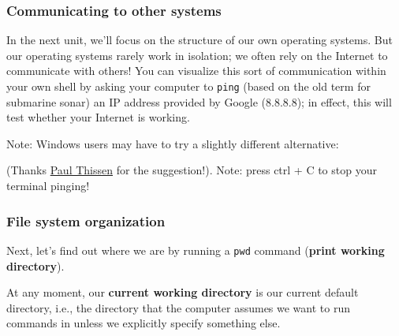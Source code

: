 \documentclass[
  letterpaper,
  DIV=11,
  numbers=noendperiod]{scrreprt}
\newenvironment{Shaded}{\begin{snugshade}}{\end{snugshade}}
\newcommand{\AttributeTok}[1]{\textcolor[rgb]{0.40,0.45,0.13}{#1}}
\newcommand{\ExtensionTok}[1]{\textcolor[rgb]{0.00,0.23,0.31}{#1}}
\newcommand{\NormalTok}[1]{\textcolor[rgb]{0.00,0.23,0.31}{#1}}
\begin{document}
\hypertarget{communicating-to-other-systems}{%
\subsubsection*{Communicating to other
systems}\label{communicating-to-other-systems}}

In the next unit, we'll focus on the structure of our own operating
systems. But our operating systems rarely work in isolation; we often
rely on the Internet to communicate with others! You can visualize this
sort of communication within your own shell by asking your computer to
\texttt{ping} (based on the old term for submarine sonar) an IP address
provided by Google (8.8.8.8); in effect, this will test whether your
Internet is working.

\begin{Shaded}
\end{Shaded}

Note: Windows users may have to try a slightly different alternative:

\begin{Shaded}
\end{Shaded}

(Thanks \href{http://www.paulthissen.org/}{Paul Thissen} for the
suggestion!). Note: press ctrl + C to stop your terminal pinging!

\hypertarget{file-system-organization}{%
\subsubsection*{File system
organization}\label{file-system-organization}}

Next, let's find out where we are by running a \texttt{pwd} command
(\textbf{print working directory}).

At any moment, our \textbf{current working directory} is our current
default directory, i.e., the directory that the computer assumes we want
to run commands in unless we explicitly specify something else.
\end{document}

